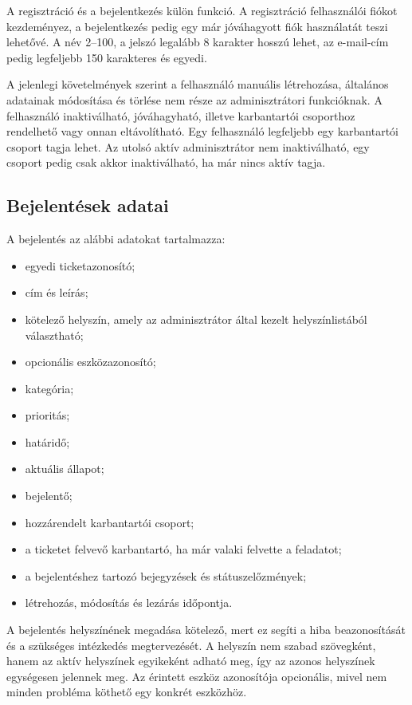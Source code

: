 \documentclass[12pt, a4paper, twoside]{article}
\begin{document}
A regisztráció és a bejelentkezés külön funkció. A regisztráció felhasználói fiókot kezdeményez, a bejelentkezés pedig egy már jóváhagyott fiók használatát teszi lehetővé. A név 2--100, a jelszó legalább 8 karakter hosszú lehet, az e-mail-cím pedig legfeljebb 150 karakteres és egyedi.

A jelenlegi követelmények szerint a felhasználó manuális létrehozása, általános adatainak módosítása és törlése nem része az adminisztrátori funkcióknak. A felhasználó inaktiválható, jóváhagyható, illetve karbantartói csoporthoz rendelhető vagy onnan eltávolítható. Egy felhasználó legfeljebb egy karbantartói csoport tagja lehet. Az utolsó aktív adminisztrátor nem inaktiválható, egy csoport pedig csak akkor inaktiválható, ha már nincs aktív tagja.

\subsection{Bejelentések adatai}

A bejelentés az alábbi adatokat tartalmazza:

\begin{itemize}
    \item egyedi ticketazonosító;
    \item cím és leírás;
    \item kötelező helyszín, amely az adminisztrátor által kezelt helyszínlistából választható;
    \item opcionális eszközazonosító;
    \item kategória;
    \item prioritás;
    \item határidő;
    \item aktuális állapot;
    \item bejelentő;
    \item hozzárendelt karbantartói csoport;
    \item a ticketet felvevő karbantartó, ha már valaki felvette a feladatot;
    \item a bejelentéshez tartozó bejegyzések és státuszelőzmények;
    \item létrehozás, módosítás és lezárás időpontja.
\end{itemize}

A bejelentés helyszínének megadása kötelező, mert ez segíti a hiba beazonosítását és a szükséges intézkedés megtervezését. A helyszín nem szabad szövegként, hanem az aktív helyszínek egyikeként adható meg, így az azonos helyszínek egységesen jelennek meg. Az érintett eszköz azonosítója opcionális, mivel nem minden probléma köthető egy konkrét eszközhöz.
\end{document}
